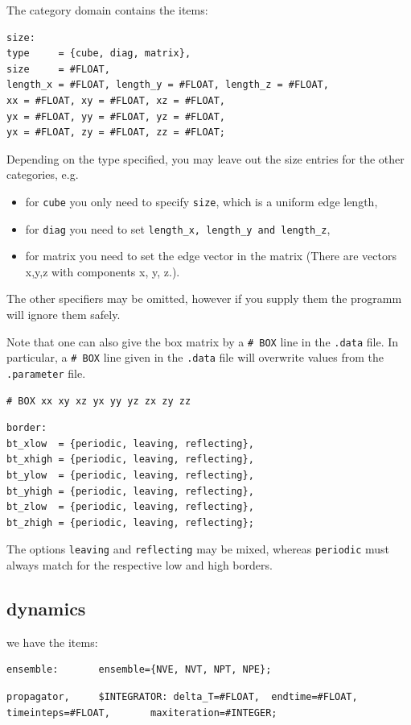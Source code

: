 The category domain contains the items:
\begin{lstlisting}
size:
type     = {cube, diag, matrix},
size     = #FLOAT,
length_x = #FLOAT, length_y = #FLOAT, length_z = #FLOAT,
xx = #FLOAT, xy = #FLOAT, xz = #FLOAT,
yx = #FLOAT, yy = #FLOAT, yz = #FLOAT,
yx = #FLOAT, zy = #FLOAT, zz = #FLOAT;
\end{lstlisting}

Depending on the type specified, you may leave out the size entries for the other categories, e.g. 
\begin{itemize}
 \item for {\tt cube} you only need to specify \texttt{size}, which is a uniform edge length,
 \item for {\tt diag} you need to set \texttt{length\_x, length\_y and length\_z},
 \item for matrix you need to set the edge vector in the matrix (There are vectors x,y,z with components x, y, z.).
\end{itemize}
The other specifiers may be omitted, however if you supply them the programm will ignore them safely.

Note that one can also give the box matrix by a \texttt{\# BOX} line
in the \texttt{.data} file. In particular, a \texttt{\# BOX} line
given in the \texttt{.data} file will overwrite values from the
\texttt{.parameter} file.
\begin{lstlisting}
# BOX xx xy xz yx yy yz zx zy zz
\end{lstlisting}

\begin{lstlisting}
border:
bt_xlow  = {periodic, leaving, reflecting},
bt_xhigh = {periodic, leaving, reflecting},
bt_ylow  = {periodic, leaving, reflecting},
bt_yhigh = {periodic, leaving, reflecting},
bt_zlow  = {periodic, leaving, reflecting},
bt_zhigh = {periodic, leaving, reflecting};
\end{lstlisting}

The options {\tt leaving} and {\tt reflecting} may be mixed, whereas {\tt periodic} must always match for the respective low and high borders.

\subsection{dynamics}
\label{sub:dynamics}
we have the items:
\begin{lstlisting}
ensemble:       ensemble={NVE, NVT, NPT, NPE};
\end{lstlisting}
\begin{lstlisting}
propagator,     $INTEGRATOR: delta_T=#FLOAT,  endtime=#FLOAT,     timeinteps=#FLOAT,       maxiteration=#INTEGER;
\end{lstlisting}

